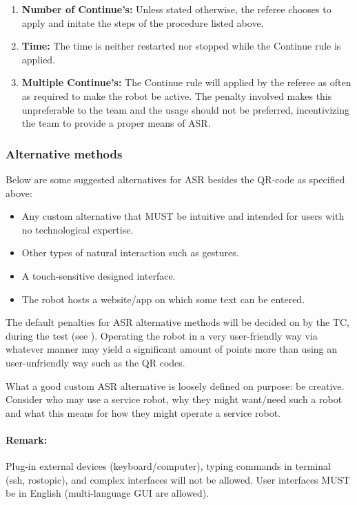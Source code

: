 \begin{enumerate}
	\item \textbf{Number of Continue's:} Unless stated otherwise, the referee chooses to apply and initate the steps of the procedure listed above.
	\item \textbf{Time:} The time is neither restarted nor stopped while the Continue rule is applied.
	\item \textbf{Multiple Continue's:} The Continue rule will applied by the referee as often as required to make the robot be active. The penalty involved makes this unpreferable to the team and the usage should not be preferred, incentivizing the team to provide a proper means of ASR.
\end{enumerate}


\subsubsection{Alternative methods}
\label{rule:asralternative}
Below are some suggested alternatives for ASR besides the QR-code as specified above:
\begin{itemize}
	\item Any custom alternative that MUST be intuitive and intended for users with no technological expertise.
 	\item Other types of natural interaction such as gestures.
 	\item A touch-sensitive designed interface.
	\item The robot hosts a website/app on which some text can be entered.
\end{itemize}

The default penalties for ASR alternative methods will be decided on by the TC, during the  test (see ).
Operating the robot in a very user-friendly way via whatever manner may yield a significant amount of points more than using an user-unfriendly way such as the QR codes. 

What a good custom ASR alternative is loosely defined on purpose: be creative. Consider who may use a service robot, why they might want/need such a robot and what this means for how they might operate a service robot.

\paragraph*{Remark:} Plug-in external devices (keyboard/computer), typing commands in terminal (ssh, rostopic), and complex interfaces will not be allowed. User interfaces MUST be in English (multi-language GUI are allowed).

